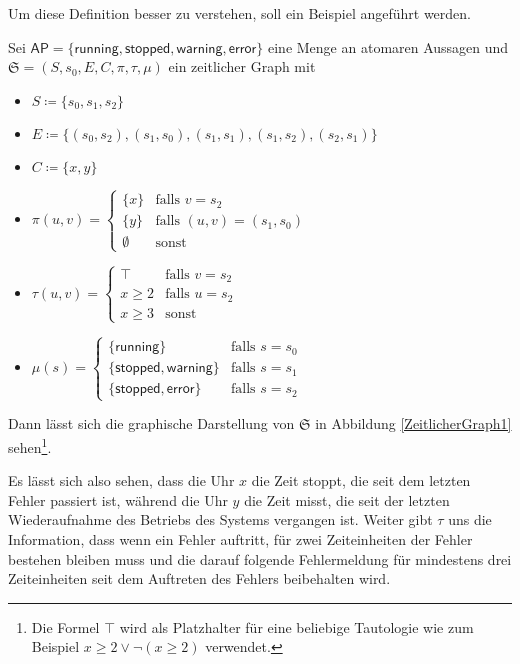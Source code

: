 Um diese Definition besser zu verstehen, soll ein Beispiel angeführt werden.
\begin{example}
	Sei $\mathsf{AP}=\{\mathsf{running},\mathsf{stopped},\mathsf{warning},\mathsf{error}\}$ eine Menge an atomaren Aussagen und $\mathfrak{S}=(S,s_0,E,C,\pi,\tau,\mu)$ ein zeitlicher Graph mit
	\begin{itemize}
		\item $S\coloneqq \{s_0,s_1,s_2\}$
		\item $E\coloneqq\{(s_0,s_2),(s_1,s_0),(s_1,s_1),(s_1,s_2),(s_2,s_1)\}$
		\item $C\coloneqq\{x,y\}$
		\item $\pi(u,v) = \begin{cases}
			\{x\} & \text{falls } v = s_2 \\
			\{y\} & \text{falls } (u,v)=(s_1,s_0) \\
			\emptyset & \text{sonst} \end{cases}$
		\item $\tau(u,v) = \begin{cases}
			\top & \text{falls } v = s_2 \\
			x\geq 2 & \text{falls } u = s_2 \\
			x \geq 3 & \text{sonst}
		\end{cases}$
		\item $\mu(s)=\begin{cases}
			\{\mathsf{running}\} & \text{falls } s = s_0 \\
			\{\mathsf{stopped},\mathsf{warning}\} & \text{falls } s = s_1 \\
			\{\mathsf{stopped},\mathsf{error}\} & \text{falls } s = s_2
		\end{cases}$
	\end{itemize}
	Dann lässt sich die graphische Darstellung von $\mathfrak{S}$ in Abbildung \ref{ZeitlicherGraph1} sehen\footnote{Die Formel $\top$ wird als Platzhalter für eine beliebige Tautologie wie zum Beispiel $x \geq 2 \lor \neg(x\geq 2)$ verwendet.}.
	
	Es lässt sich also sehen, dass die Uhr $x$ die Zeit stoppt, die seit dem letzten Fehler passiert ist, während die Uhr $y$ die Zeit misst, die seit der letzten Wiederaufnahme des Betriebs des Systems vergangen ist.
	Weiter gibt $\tau$ uns die Information, dass wenn ein Fehler auftritt, für zwei Zeiteinheiten der Fehler bestehen bleiben muss und die darauf folgende Fehlermeldung für mindestens drei Zeiteinheiten seit dem Auftreten des Fehlers beibehalten wird.
\end{example}

